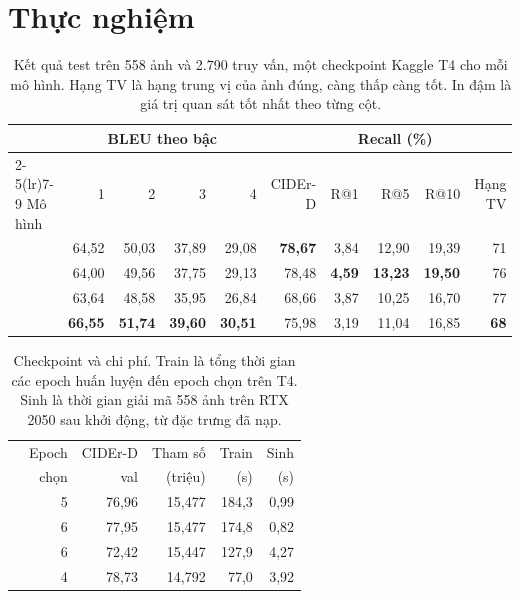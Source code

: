 \section{Thực nghiệm}

\begin{table}[t]
  \centering
  \begin{tabular}{@{}lrrrrrrrrr@{}}
    \toprule
    & \multicolumn{4}{c}{BLEU theo bậc} & &
      \multicolumn{3}{c}{Recall (\%)} & \\
    \cmidrule(lr){2-5}\cmidrule(lr){7-9}
    Mô hình & 1 & 2 & 3 & 4 & CIDEr-D & R@1 & R@5 & R@10 & Hạng TV \\
    \midrule
    \modelA{} & 64,52 & 50,03 & 37,89 & 29,08 & \textbf{78,67}
        & 3,84 & 12,90 & 19,39 & 71 \\
    \modelAz{} & 64,00 & 49,56 & 37,75 & 29,13 & 78,48
        & \textbf{4,59} & \textbf{13,23} & \textbf{19,50} & 76 \\
    \modelB{} & 63,64 & 48,58 & 35,95 & 26,84 & 68,66
        & 3,87 & 10,25 & 16,70 & 77 \\
    \modelC{} & \textbf{66,55} & \textbf{51,74} & \textbf{39,60} & \textbf{30,51} & 75,98
        & 3,19 & 11,04 & 16,85 & \textbf{68} \\
    \bottomrule
  \end{tabular}
  \caption{Kết quả test trên 558 ảnh và 2.790 truy vấn, một checkpoint Kaggle T4 cho mỗi mô hình. Hạng TV là hạng trung vị của ảnh đúng, càng thấp càng tốt. In đậm là giá trị quan sát tốt nhất theo từng cột.}
  \label{tab:test}
\end{table}

\begin{table}[t]
  \centering
  \setlength{\tabcolsep}{4pt}
  \begin{tabular}{@{}lrrrrr@{}}
    \toprule
     & Epoch & CIDEr-D & Tham số & Train & Sinh \\
    & chọn & val & (triệu) & (s) & (s) \\
    \midrule
    \modelA{}  & 5 & 76,96 & 15,477 & 184,3 & 0,99 \\
    \modelAz{} & 6 & 77,95 & 15,477 & 174,8 & 0,82 \\
    \modelB{}  & 6 & 72,42 & 15,447 & 127,9 & 4,27 \\
    \modelC{}  & 4 & 78,73 & 14,792 & 77,0  & 3,92 \\
    \bottomrule
  \end{tabular}
  \caption{Checkpoint và chi phí. Train là tổng thời gian các epoch huấn luyện đến epoch chọn trên T4. Sinh là thời gian giải mã 558 ảnh trên RTX 2050 sau khởi động, từ đặc trưng đã nạp.}
  \label{tab:cost}
\end{table}

